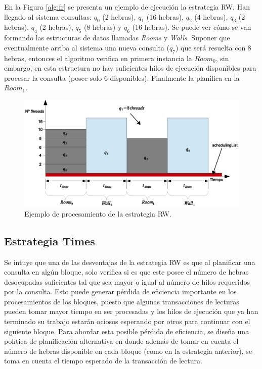 En la Figura \ref{alg:fr} se presenta un ejemplo de ejecución la estrategia RW. Han llegado al sistema consultas: $q_{0}$ (2 hebras), $q_1$ (16 hebras), $q_2$ (4 hebras), $q_3$ (2 hebras), $q_4$ (2 hebras), $q_5$ (8 hebras) y $q_6$ (16 hebras). Se puede ver cómo se van formando las estructuras de datos llamadas \textit{Rooms} y \textit{Walls}. Suponer que eventualmente arriba al sistema una nueva consulta ($q_7$) que será resuelta con 8 hebras, entonces el algoritmo verifica en primera instancia la $Room_0$, sin embargo, en esta estructura no hay suficientes hilos de ejecución disponibles para procesar la consulta (posee solo 6 disponibles). Finalmente la planifica en la $Room_1$.

\begin{figure}[!th]
\centering
\includegraphics[scale=.75]{images/proceso_FR.eps}
\caption{Ejemplo de procesamiento de la estrategia RW.}
\label{fig:proceso_FR}
\end{figure} 

\subsection{Estrategia Times}
\label{scheduling:times}
Se intuye que una de las desventajas de la estrategia RW es que al planificar una consulta en algún bloque, solo verifica si es que este posee el número de hebras desocupadas suficientes tal que sea mayor o igual al número de hilos requeridos por la consulta. Esto puede generar pérdida de eficiencia importante en los procesamientos de los bloques, puesto que algunas transacciones de lecturas pueden tomar mayor tiempo en ser procesadas y los hilos de ejecución que ya han terminado su trabajo estarán ociosos esperando por otros para continuar con el siguiente bloque. Para abordar esta posible pérdida de eficiencia, se diseña una política de planificación alternativa en donde además de tomar en cuenta el número de hebras disponible en cada bloque (como en la estrategia anterior), se toma en cuenta el tiempo esperado de la transacción de lectura.

